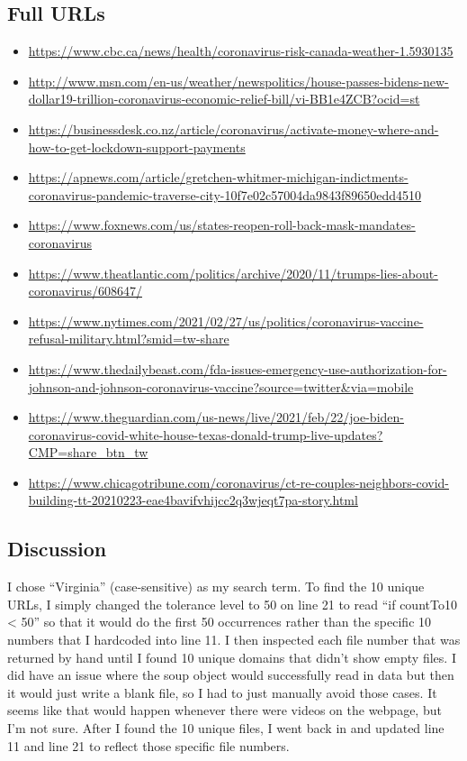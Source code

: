 \documentclass[12pt]{article}
\begin{document}
\subsection*{Full URLs}
\begin{itemize}
    \item \url{https://www.cbc.ca/news/health/coronavirus-risk-canada-weather-1.5930135}
    \item \url{http://www.msn.com/en-us/weather/newspolitics/house-passes-bidens-new-dollar19-trillion-coronavirus-economic-relief-bill/vi-BB1e4ZCB?ocid=st}
    \item \url{https://businessdesk.co.nz/article/coronavirus/activate-money-where-and-how-to-get-lockdown-support-payments}
    \item \url{https://apnews.com/article/gretchen-whitmer-michigan-indictments-coronavirus-pandemic-traverse-city-10f7e02c57004da9843f89650edd4510}
    \item \url{https://www.foxnews.com/us/states-reopen-roll-back-mask-mandates-coronavirus}
    \item \url{https://www.theatlantic.com/politics/archive/2020/11/trumps-lies-about-coronavirus/608647/}
    \item \url{https://www.nytimes.com/2021/02/27/us/politics/coronavirus-vaccine-refusal-military.html?smid=tw-share}
    \item \url{https://www.thedailybeast.com/fda-issues-emergency-use-authorization-for-johnson-and-johnson-coronavirus-vaccine?source=twitter&via=mobile}
    \item \url{https://www.theguardian.com/us-news/live/2021/feb/22/joe-biden-coronavirus-covid-white-house-texas-donald-trump-live-updates?CMP=share_btn_tw}
    \item \url{https://www.chicagotribune.com/coronavirus/ct-re-couples-neighbors-covid-building-tt-20210223-eae4bavifvhijcc2q3wjeqt7pa-story.html}
\end{itemize}

\subsection*{Discussion}
I chose ``Virginia'' (case-sensitive) as my search term. To find the 10 unique URLs, I simply changed the tolerance level to 50 on line 21 to read ``if countTo10 < 50'' so that it would do the first 50 occurrences rather than the specific 10 numbers that I hardcoded into line 11. I then inspected each file number that was returned by hand until I found 10 unique domains that didn't show empty files. I did have an issue where the soup object would successfully read in data but then it would just write a blank file, so I had to just manually avoid those cases. It seems like that would happen whenever there were videos on the webpage, but I'm not sure. After I found the 10 unique files, I went back in and updated line 11 and line 21 to reflect those specific file numbers.
\end{document}
